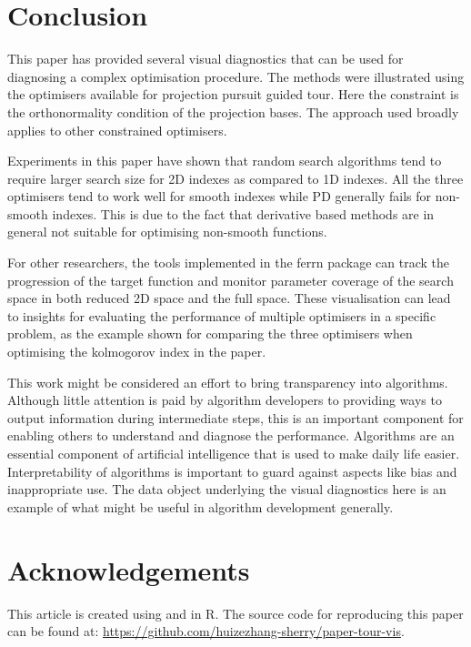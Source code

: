 \hypertarget{conclusion}{%
\section{Conclusion}\label{conclusion}}

This paper has provided several visual diagnostics that can be used for
diagnosing a complex optimisation procedure. The methods were
illustrated using the optimisers available for projection pursuit guided
tour. Here the constraint is the orthonormality condition of the
projection bases. The approach used broadly applies to other constrained
optimisers.

Experiments in this paper have shown that random search algorithms tend
to require larger search size for 2D indexes as compared to 1D indexes.
All the three optimisers tend to work well for smooth indexes while PD
generally fails for non-smooth indexes. This is due to the fact that
derivative based methods are in general not suitable for optimising
non-smooth functions.

For other researchers, the tools implemented in the ferrn package can
track the progression of the target function and monitor parameter
coverage of the search space in both reduced 2D space and the full
space. These visualisation can lead to insights for evaluating the
performance of multiple optimisers in a specific problem, as the example
shown for comparing the three optimisers when optimising the kolmogorov
index in the paper.

This work might be considered an effort to bring transparency into
algorithms. Although little attention is paid by algorithm developers to
providing ways to output information during intermediate steps, this is
an important component for enabling others to understand and diagnose
the performance. Algorithms are an essential component of artificial
intelligence that is used to make daily life easier. Interpretability of
algorithms is important to guard against aspects like bias and
inappropriate use. The data object underlying the visual diagnostics
here is an example of what might be useful in algorithm development
generally.

\hypertarget{acknowledgements}{%
\section{Acknowledgements}\label{acknowledgements}}

This article is created using  \citep{knitr} and
 \citep{rmarkdown} in R. The source code for
reproducing this paper can be found at:
\url{https://github.com/huizezhang-sherry/paper-tour-vis}.

